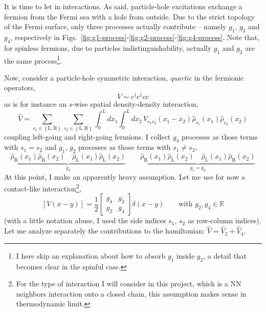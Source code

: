 It is time to let in interactions. As said, particle-hole excitations exchange a fermion from the Fermi sea with a hole from outside. Due to the strict topology of the Fermi surface, only three processes actually contribute -- namely $g_1$, $g_2$ and $g_4$, respectively in Figs.~\ref{fig:g1-process}-\ref{fig:g2-process}-\ref{fig:g4-process}. Note that, for spinless fermions, due to particles indistinguishability, actually $g_1$ and $g_2$ are the same process\footnote{
	I here skip an explanation about how to absorb $g_1$ inside $g_2$, a detail that becomes clear in the spinful case.
}.

Now, consider a particle-hole symmetric interaction, \textit{quartic} in the fermionic operators,
\[
	V \sim c^\dagger c^\dagger c c
\]
as is for instance an $s$-wise spatial density-density interaction,
\[
	\hat V = \sum_{s_1 \in \left\{\mathrm L, \mathrm R\right\}} \sum_{s_2 \in \left\{\mathrm L, \mathrm R\right\}} \int_0^L dx_1 \int_0^L dx_2 \, V_{s_1 s_2}(x_1-x_2) \hat \rho_{s_1}(x_1) \hat \rho_{s_2} (x_2)
\]
coupling left-going and right-going fermions. I collect $g_4$ processes as those terms with $s_1 = s_2$ and $g_1$, $g_2$ processes as those terms with $s_1 \neq s_2$,
\[
	\underbrace{\hat \rho_\mathrm{R} (x_1) \hat \rho_\mathrm{R} (x_2) \quad \hat \rho_\mathrm{L} (x_1) \hat \rho_\mathrm{L} (x_2)}_{g_4} \qquad \underbrace{\hat \rho_\mathrm{R} (x_1) \hat \rho_\mathrm{L} (x_2) \quad \hat \rho_\mathrm{L} (x_1) \hat \rho_\mathrm{R} (x_2)}_{g_1 = g_2}
\]
At this point, I make an apparently heavy assumption. Let me use for now a contact-like interaction\footnote{
	For the type of interaction I will consider in this project, which is a NN neighbors interaction onto a closed chain, this assumption makes sense in thermodynamic limit.
},
\[
	\left[V(x-y)\right] = \frac{1}{2} \begin{bmatrix}
		g_4 & g_2 \\ g_2 & g_4
	\end{bmatrix} \delta(x-y)
	\qquad
	\text{with $g_2, g_4 \in \mathbb{R}$}
\]
(with a little notation abuse, I used the side indices $s_1$, $s_2$ as row-column indices). Let me analyze separately the contributions to the hamiltonian: $\hat V = \hat V_2 + \hat V_4$.

